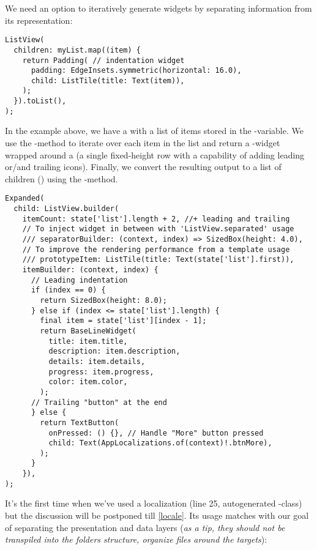 \noindent We need an option to iteratively generate widgets by separating information from its representation:

\begin{lstlisting}
ListView(
  children: myList.map((item) {
    return Padding( // indentation widget
      padding: EdgeInsets.symmetric(horizontal: 16.0),
      child: ListTile(title: Text(item)),
    );
  }).toList(),
);
\end{lstlisting}

\noindent In the example above, we have a  with a list of items stored in the -variable. We use 
the -method to iterate over each item in the list and return a -widget wrapped around a 
 (a single fixed-height row with a capability of adding leading or/and trailing icons). Finally, we convert 
the resulting output  to a list of children () using the -method. 

\begin{lstlisting}
Expanded(
  child: ListView.builder(
    itemCount: state['list'].length + 2, //+ leading and trailing
    // To inject widget in between with 'ListView.separated' usage
    /// separatorBuilder: (context, index) => SizedBox(height: 4.0),
    // To improve the rendering performance from a template usage
    /// prototypeItem: ListTile(title: Text(state['list'].first)),
    itemBuilder: (context, index) {
      // Leading indentation
      if (index == 0) { 
        return SizedBox(height: 8.0);
      } else if (index <= state['list'].length) {
        final item = state['list'][index - 1];
        return BaseLineWidget(
          title: item.title,
          description: item.description,
          details: item.details,
          progress: item.progress,
          color: item.color,
        );
      // Trailing "button" at the end
      } else { 
        return TextButton(
          onPressed: () {}, // Handle "More" button pressed
          child: Text(AppLocalizations.of(context)!.btnMore),
        );
      }
    }),
);
\end{lstlisting}

\noindent It's the first time when we've used a localization (line 25, autogenerated -class) but the 
discussion will be postponed till \cref{locale}. Its usage matches with our goal of separating the presentation and data 
layers (\emph{as a tip, they should not be transpiled into the folders structure, organize files around the targets}):

